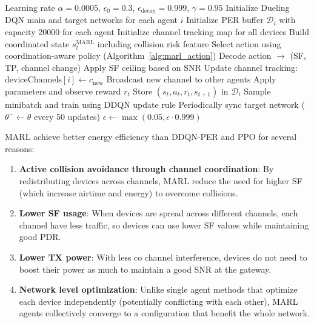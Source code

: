 \documentclass[12pt,a4paper]{article}
\begin{document}
\begin{algorithm}[H]
\caption{MARL ADR Agent -- Full Training Loop}
\label{alg:marl_full}
\begin{algorithmic}[1]
\Require Learning rate $\alpha = 0.0005$, $\epsilon_0 = 0.3$, $\epsilon_{\text{decay}} = 0.999$, $\gamma = 0.95$
\State Initialize Dueling DQN main and target networks for each agent $i$
\State Initialize PER buffer $\mathcal{D}_i$ with capacity 20000 for each agent
\State Initialize channel tracking map for all devices
    \State Build coordinated state $s_t^{\text{MARL}}$ including collision risk feature
    \State Select action using coordination-aware policy (Algorithm~\ref{alg:marl_action})
    \State Decode action $\to$ (SF, TP, channel change)
    \State Apply SF ceiling based on SNR
    \State Update channel tracking: $\text{deviceChannels}[i] \gets c_{\text{new}}$
    \State Broadcast new channel to other agents
    \State Apply parameters and observe reward $r_t$
    \State Store $(s_t, a_t, r_t, s_{t+1})$ in $\mathcal{D}_i$
    \State Sample minibatch and train using DDQN update rule
    \State Periodically sync target network ($\theta^- \gets \theta$ every 50 updates)
    \State $\epsilon \gets \max(0.05, \epsilon \cdot 0.999)$
\EndFor
\end{algorithmic}
\end{algorithm}


MARL achieve better energy efficiency than DDQN-PER and PPO for several reasons:

\begin{enumerate}
    \item \textbf{Active collision avoidance through channel coordination}: By redistributing devices across channels, MARL reduce the need for higher SF (which increase airtime and energy) to overcome collisions.
    \item \textbf{Lower SF usage}: When devices are spread across different channels, each channel have less traffic, so devices can use lower SF values while maintaining good PDR.
    \item \textbf{Lower TX power}: With less co channel interference, devices do not need to boost their power as much to maintain a good SNR at the gateway.
    \item \textbf{Network level optimization}: Unlike single agent methods that optimize each device independently (potentially conflicting with each other), MARL agents collectively converge to a configuration that benefit the whole network.
\end{enumerate}
\end{document}
